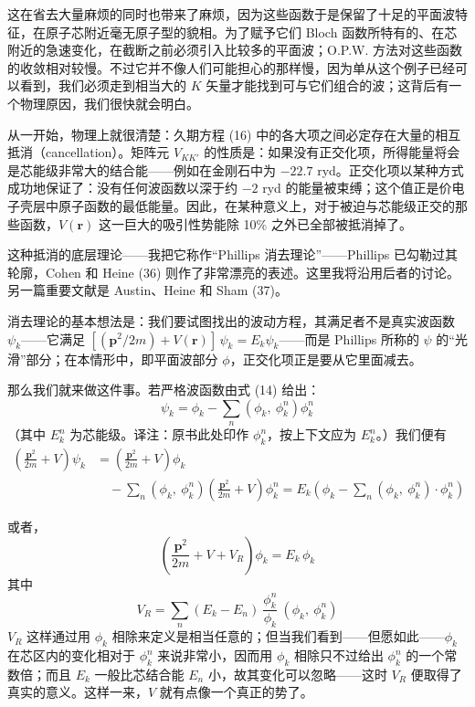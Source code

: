 这在省去大量麻烦的同时也带来了麻烦，因为这些函数于是保留了十足的平面波特征，在原子芯附近毫无原子型的貌相。为了赋予它们 Bloch 函数所特有的、在芯附近的急速变化，在截断之前必须引入比较多的平面波；O.P.W. 方法对这些函数的收敛相对较慢。不过它并不像人们可能担心的那样慢，因为单从这个例子已经可以看到，我们必须走到相当大的 $K$ 矢量才能找到可与它们组合的波；这背后有一个物理原因，我们很快就会明白。

从一开始，物理上就很清楚：久期方程 (16) 中的各大项之间必定存在大量的相互抵消（cancellation）。矩阵元 $V_{KK'}$ 的性质是：如果没有正交化项，所得能量将会是芯能级非常大的结合能——例如在金刚石中为 $-22.7$ ryd。正交化项以某种方式成功地保证了：没有任何波函数以深于约 $-2$ ryd 的能量被束缚；这个值正是价电子壳层中原子函数的最低能量。因此，在某种意义上，对于被迫与芯能级正交的那些函数，$V(\mathbf{r})$ 这一巨大的吸引性势能除 10\% 之外已全部被抵消掉了。

这种抵消的底层理论——我把它称作“Phillips 消去理论”——Phillips 已勾勒过其轮廓，Cohen 和 Heine (36) 则作了非常漂亮的表述。这里我将沿用后者的讨论。另一篇重要文献是 Austin、Heine 和 Sham (37)。

消去理论的基本想法是：我们要试图找出的波动方程，其满足者不是真实波函数 $\psi_k$——它满足 $[(\mathbf{p}^2/2m)+V(\mathbf{r})]\,\psi_k=E_k\psi_k$——而是 Phillips 所称的 $\psi$ 的“光滑”部分；在本情形中，即平面波部分 $\phi$，正交化项正是要从它里面减去。

那么我们就来做这件事。若严格波函数由式 (14) 给出：
\begin{equation*}
\psi_k=\phi_k-\sum_n\left(\phi_k,\ \phi_k^n\right)\phi_k^n
\end{equation*}
（其中 $E_k^n$ 为芯能级。译注：原书此处印作 $\phi_k^n$，按上下文应为 $E_k^n$。）我们便有
\begin{align*}
\left(\frac{\mathbf{p}^2}{2m}+V\right)\psi_k&=\left(\frac{\mathbf{p}^2}{2m}+V\right)\phi_k\\
&\quad-\sum_n\left(\phi_k,\ \phi_k^n\right)\left(\frac{\mathbf{p}^2}{2m}+V\right)\phi_k^n=E_k\left(\phi_k-\sum_n\left(\phi_k,\ \phi_k^n\right)\cdot\phi_k^n\right)
\end{align*}

或者，
\begin{equation*}
\left(\frac{\mathbf{p}^2}{2m}+V+V_R\right)\phi_k=E_k\,\phi_k
\end{equation*}
其中
\begin{equation*}
V_R=\sum_n\left(E_k-E_n\right)\ \frac{\phi_k^n}{\phi_k}\ \left(\phi_k,\ \phi_k^n\right)
\end{equation*}
$V_R$ 这样通过用 $\phi_k$ 相除来定义是相当任意的；但当我们看到——但愿如此——$\phi_k$ 在芯区内的变化相对于 $\phi_k^n$ 来说非常小，因而用 $\phi_k$ 相除只不过给出 $\phi_k^n$ 的一个常数倍；而且 $E_k$ 一般比芯结合能 $E_n$ 小，故其变化可以忽略——这时 $V_R$ 便取得了真实的意义。这样一来，$V$ 就有点像一个真正的势了。

